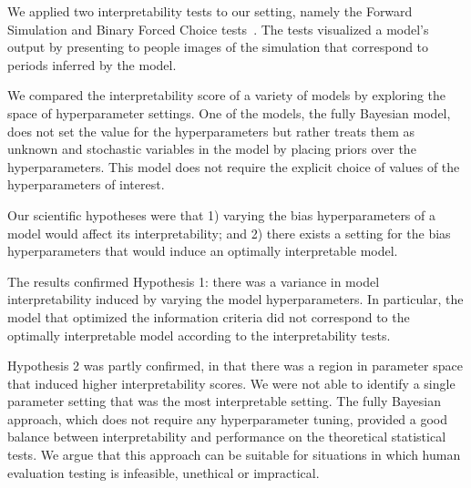 \documentclass[letterpaper]{article} %
\newcommand{\citename}[1]{\citeauthor{#1}~\shortcite{#1}}
\newcommand{\kibitz}[2]{\ifnum\Comments=1{\textcolor{#1}{#2}}\fi}
\newcommand{\kg}[1]{\kibitz{red}{[KG:#1]}}
\begin{document}


We applied two interpretability tests to our setting, namely the Forward Simulation and Binary Forced Choice tests~\cite{doshi2017roadmap}.
The tests visualized a model's output by presenting to people images of the simulation that correspond to periods inferred by the model.

We compared the interpretability score %
of a variety of models by exploring the space of hyperparameter settings.
One of the models, the fully Bayesian model, does not set the value for the hyperparameters but rather treats them as unknown and stochastic variables in the model by placing priors over the hyperparameters.
This model does not require the explicit choice of values of the hyperparameters of interest.

Our scientific hypotheses were that 1) varying the bias hyperparameters of a model would affect its interpretability; and 2) there exists a setting for the bias hyperparameters that would induce an optimally interpretable model. 


The results confirmed Hypothesis 1: there was a variance in model interpretability induced by varying the model hyperparameters. 
In particular, the model that optimized the information criteria did not correspond to the optimally interpretable model according to the interpretability tests. 

Hypothesis 2 was partly confirmed, in that there was a region in parameter space that induced higher interpretability scores. We were not able to identify a single parameter setting that was the most interpretable setting. 
The fully Bayesian approach, which does not require any hyperparameter tuning, provided a good balance between interpretability and performance on the theoretical statistical tests.
We argue that this approach can be suitable for situations in which human evaluation testing is infeasible, unethical or impractical.
\end{document}
